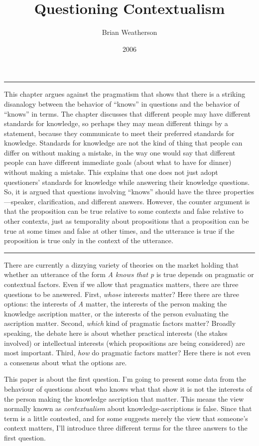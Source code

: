 \documentclass[
  10pt,
  letterpaper,
  DIV=11,
  numbers=noendperiod,
  twoside]{scrartcl}
\title{Questioning Contextualism}
\author{Brian Weatherson}
\date{2006}
\renewenvironment{abstract}
 {\vspace{-1.25cm}
 \quotation\small\noindent\rule{\linewidth}{.5pt}\par\smallskip
 \noindent }
 {\par\noindent\rule{\linewidth}{.5pt}\endquotation}
\begin{document}
\maketitle
\begin{abstract}
This chapter argues against the pragmatism that shows that there is a
striking disanalogy between the behavior of ``knows'' in questions and
the behavior of ``knows'' in terms. The chapter discusses that different
people may have different standards for knowledge, so perhaps they may
mean different things by a statement, because they communicate to meet
their preferred standards for knowledge. Standards for knowledge are not
the kind of thing that people can differ on without making a mistake, in
the way one would say that different people can have different immediate
goals (about what to have for dinner) without making a mistake. This
explains that one does not just adopt questioners' standards for
knowledge while answering their knowledge questions. So, it is argued
that questions involving ``knows'' should have the three
properties---speaker, clarification, and different answers. However, the
counter argument is that the proposition can be true relative to some
contexts and false relative to other contexts, just as temporality about
propositions that a proposition can be true at some times and false at
other times, and the utterance is true if the proposition is true only
in the context of the utterance.
\end{abstract}

There are currently a dizzying variety of theories on the market holding
that whether an utterance of the form \emph{A knows that p} is true
depends on pragmatic or contextual factors. Even if we allow that
pragmatics matters, there are three questions to be answered. First,
\emph{whose} interests matter? Here there are three options: the
interests of \emph{A} matter, the interests of the person making the
knowledge ascription matter, or the interests of the person evaluating
the ascription matter. Second, \emph{which} kind of pragmatic factors
matter? Broadly speaking, the debate here is about whether practical
interests (the stakes involved) or intellectual interests (which
propositions are being considered) are most important. Third, \emph{how}
do pragmatic factors matter? Here there is not even a consensus about
what the options are.

This paper is about the first question. I'm going to present some data
from the behaviour of questions about who knows what that show it is not
the interests of the person making the knowledge ascription that matter.
This means the view normally known as \emph{contextualism} about
knowledge-ascriptions is false. Since that term is a little contested,
and for some suggests merely the view that someone's context matters,
I'll introduce three different terms for the three answers to the first
question.
\end{document}
